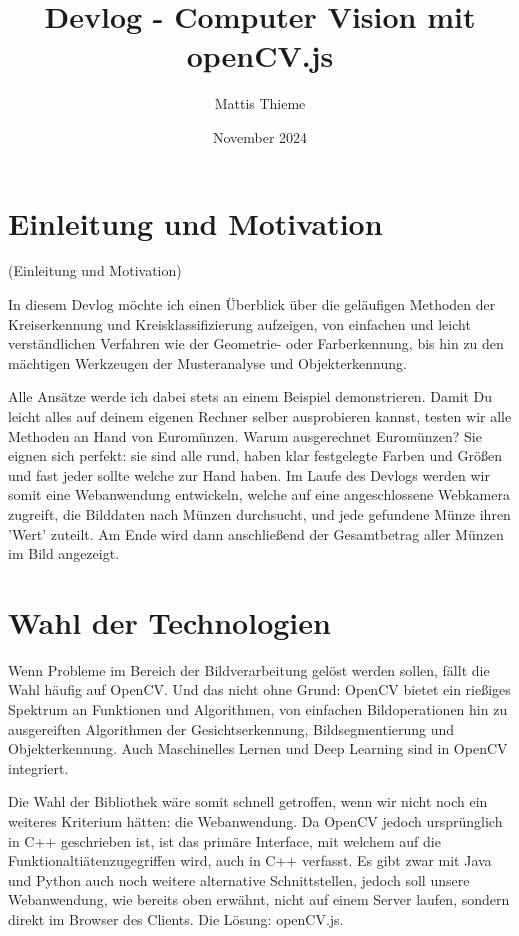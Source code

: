 \documentclass{article}
\title{Devlog - Computer Vision mit openCV.js}
\author{Mattis Thieme}
\date{November 2024}
\begin{document}
\maketitle

\renewcommand*\contentsname{Inhaltsverzeichnis} %
\tableofcontents

\section{Einleitung und Motivation}
(Einleitung und Motivation)

In diesem Devlog möchte ich einen Überblick über die geläufigen Methoden der Kreiserkennung und Kreisklassifizierung aufzeigen, von einfachen und leicht verständlichen Verfahren wie der Geometrie- oder Farberkennung, bis hin zu den mächtigen Werkzeugen der Musteranalyse und Objekterkennung. 

Alle Ansätze werde ich dabei stets an einem Beispiel demonstrieren. Damit Du leicht alles auf deinem eigenen Rechner selber ausprobieren kannst, testen wir alle Methoden an Hand von Euromünzen. Warum ausgerechnet Euromünzen? Sie eignen sich perfekt: sie sind alle rund, haben klar festgelegte Farben und Größen und fast jeder sollte welche zur Hand haben. Im Laufe des Devlogs werden wir somit eine Webanwendung entwickeln, welche auf eine angeschlossene Webkamera zugreift, die Bilddaten nach Münzen durchsucht, und jede gefundene Münze ihren 'Wert' zuteilt. Am Ende wird dann anschließend der Gesamtbetrag aller Münzen im Bild angezeigt. 

\section{Wahl der Technologien}
Wenn Probleme im Bereich der Bildverarbeitung gelöst werden sollen, fällt die Wahl häufig auf OpenCV. Und das nicht ohne Grund: OpenCV bietet ein rießiges Spektrum an Funktionen und Algorithmen, von einfachen Bildoperationen hin zu ausgereiften Algorithmen der Gesichtserkennung, Bildsegmentierung und Objekterkennung. Auch Maschinelles Lernen und Deep Learning sind in OpenCV integriert.

Die Wahl der Bibliothek wäre somit schnell getroffen, wenn wir nicht noch ein weiteres Kriterium hätten: die Webanwendung. Da OpenCV jedoch ursprünglich in C++ geschrieben ist, ist das primäre Interface, mit welchem auf die Funktionaltiätenzugegriffen wird, auch in C++ verfasst. Es gibt zwar mit Java und Python auch noch weitere alternative Schnittstellen, jedoch soll unsere Webanwendung, wie bereits oben erwähnt, nicht auf einem Server laufen, sondern direkt im Browser des Clients. Die Lösung: openCV.js.
\end{document}
